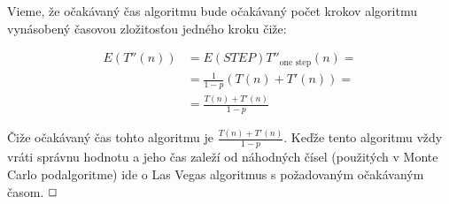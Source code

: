 \documentclass[a4paper]{article}
\begin{document}
Vieme, že očakávaný čas algoritmu bude očakávaný počet krokov algoritmu vynásobený časovou zložitosťou jedného kroku čiže:

\begin{align*}
	E(T''(n)) &= E(STEP)T''_{\text{one step}}(n) =\\
	 &= \frac{1}{1-p}(T(n) + T'(n)) =\\
	 &= \frac{T(n) + T'(n)}{1-p} 
\end{align*}

Čiže očakávaný čas tohto algoritmu je $\frac{T(n) + T'(n)}{1-p}$. Keďže tento algoritmu vždy vráti správnu hodnotu a jeho čas zaleží od náhodných čísel (použitých v Monte Carlo podalgoritme) ide o Las Vegas algoritmus s požadovaným očakávaným časom. $\oblong$ 
\end{document}
